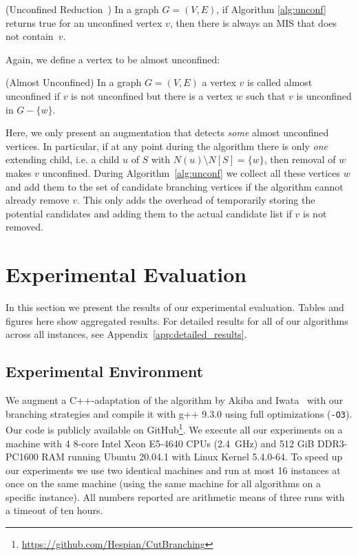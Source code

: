 \documentclass[a4paper,UKenglish,cleveref, autoref, thm-restate]{lipics-v2021}
\begin{document}
\begin{theorem}(Unconfined Reduction~\cite{XiaoUnconfined}) In a graph $G=(V,E)$,
  if Algorithm \ref{alg:unconf} returns true for an unconfined vertex $v$, then
  there is always an MIS that does not contain~$v$.
\end{theorem}

Again, we define a vertex to be almost unconfined:

\begin{definition} (Almost Unconfined)
  In a graph $G=(V,E)$ a vertex $v$ is called almost unconfined if $v$ is not unconfined but there is a vertex $w$ such that $v$ is unconfined in $G-\{w\}$.
\end{definition}

Here, we only present an augmentation that detects \emph{some} almost
unconfined vertices. In particular, if at any point during the algorithm there
is only \emph{one} extending child, i.e. a child $u$ of $S$ with $N(u)\setminus
N[S] = \{w\}$, then removal of $w$ makes $v$ unconfined. During
Algorithm~\ref{alg:unconf} we collect all these vertices $w$ and add them to the
set of candidate branching vertices if the algorithm cannot already remove $v$.
This only adds the overhead of temporarily storing the potential candidates and
adding them to the actual candidate list if $v$ is not removed.


\section{Experimental Evaluation}

In this section we present the results of our experimental evaluation. Tables
and figures here show aggregated results. For
detailed results for all of our algorithms across all instances, see Appendix~\ref{app:detailed_results}.

\subsection{Experimental Environment}
We augment a C++-adaptation of the algorithm by Akiba and
Iwata~\cite{AkibaIwata} with our branching strategies and compile it
with g++ 9.3.0 using full optimizations (\texttt{-O3}). Our
code is publicly available on GitHub\footnote{\url{https://github.com/Hespian/CutBranching}}. We execute all our experiments on a machine with 4 8-core Intel Xeon E5-4640 CPUs
(2.4~GHz) and 512 GiB DDR3-PC1600 RAM running Ubuntu 20.04.1 with Linux Kernel 5.4.0-64. To speed up our experiments we use two
identical machines and run at most 16 instances at once on the
same machine (using the same machine for all algorithms on a specific instance).
All numbers reported are arithmetic means of three runs with a timeout of ten
hours.
\end{document}
